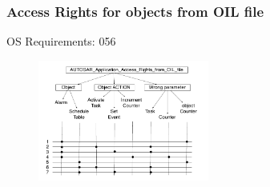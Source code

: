 \documentclass[10pt]{article}
\begin{document}
	\subsubsection{Access Rights for objects from OIL file}
	OS Requirements: 056
	
	\begin{figure}[htbp] %
  		\centering
		\includegraphics[width=0.5\textwidth]{graphics/AUTOSAR_Application_Access_Rights_OIL.pdf}
	\end{figure}
\end{document}
